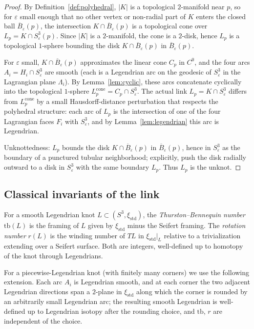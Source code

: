 \documentclass[12pt]{article}
\theoremstyle{definition}
\begin{document}
\begin{proof}
By Definition~\ref{def:polyhedral}, $|K|$ is a topological $2$-manifold near $p$, so for $\varepsilon$ small enough that no other vertex or non-radial part of $K$ enters the closed ball $\overline{B}_\varepsilon(p)$, the intersection $K\cap\overline{B}_\varepsilon(p)$ is a topological cone over $L_p=K\cap S^3_\varepsilon(p)$. Since $|K|$ is a $2$-manifold, the cone is a $2$-disk, hence $L_p$ is a topological $1$-sphere bounding the disk $K\cap\overline{B}_\varepsilon(p)$ in $\overline{B}_\varepsilon(p)$.

For $\varepsilon$ small, $K\cap\overline{B}_\varepsilon(p)$ approximates the linear cone $C_p$ in $C^0$, and the four arcs $A_i=H_i\cap S^3_\varepsilon$ are smooth (each is a Legendrian arc on the geodesic of $S^3_\varepsilon$ in the Lagrangian plane $\Lambda_i$). By Lemma~\ref{lem:cyclic}, these arcs concatenate cyclically into the topological $1$-sphere $L_p^{\mathrm{cone}} = C_p\cap S^3_\varepsilon$. The actual link $L_p=K\cap S^3_\varepsilon$ differs from $L_p^{\mathrm{cone}}$ by a small Hausdorff-distance perturbation that respects the polyhedral structure: each arc of $L_p$ is the intersection of one of the four Lagrangian faces $F_i$ with $S^3_\varepsilon$, and by Lemma~\ref{lem:legendrian} this arc is Legendrian.

Unknottedness: $L_p$ bounds the disk $K\cap\overline{B}_\varepsilon(p)$ in $\overline{B}_\varepsilon(p)$, hence in $S^3_\varepsilon$ as the boundary of a punctured tubular neighborhood; explicitly, push the disk radially outward to a disk in $S^3_\varepsilon$ with the same boundary $L_p$. Thus $L_p$ is the unknot.
\end{proof}

\subsection{Classical invariants of the link}

For a smooth Legendrian knot $L\subset(S^3,\xi_{\mathrm{std}})$, the \emph{Thurston--Bennequin number} $\mathrm{tb}(L)$ is the framing of $L$ given by $\xi_{\mathrm{std}}$ minus the Seifert framing. The \emph{rotation number} $r(L)$ is the winding number of $TL$ in $\xi_{\mathrm{std}}|_L$ relative to a trivialization extending over a Seifert surface. Both are integers, well-defined up to homotopy of the knot through Legendrians.

For a piecewise-Legendrian knot (with finitely many corners) we use the following extension. Each arc $A_i$ is Legendrian smooth, and at each corner the two adjacent Legendrian directions span a $2$-plane in $\xi_{\mathrm{std}}$ along which the corner is rounded by an arbitrarily small Legendrian arc; the resulting smooth Legendrian is well-defined up to Legendrian isotopy after the rounding choice, and $\mathrm{tb}$, $r$ are independent of the choice.
\end{document}
